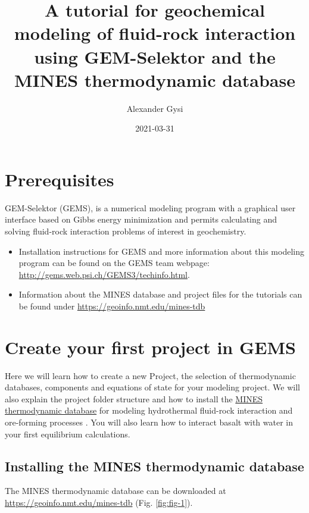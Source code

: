 \documentclass[
]{book}
\title{A tutorial for geochemical modeling of fluid-rock interaction using GEM-Selektor and the MINES thermodynamic database}
\author{Alexander Gysi}
\date{2021-03-31}
\begin{document}
\maketitle

{
\setcounter{tocdepth}{1}
\tableofcontents
}
\hypertarget{prerequisites}{%
\chapter*{Prerequisites}\label{prerequisites}}

GEM-Selektor (GEMS), is a numerical modeling program with a graphical user interface based on Gibbs energy minimization and permits calculating and solving fluid-rock interaction problems of interest in geochemistry.

\begin{itemize}
\item
  Installation instructions for GEMS and more information about this modeling program can be found on the GEMS team webpage: \url{http://gems.web.psi.ch/GEMS3/techinfo.html}.
\item
  Information about the MINES database and project files for the tutorials can be found under \url{https://geoinfo.nmt.edu/mines-tdb}
\end{itemize}

\hypertarget{intro}{%
\chapter{Create your first project in GEMS}\label{intro}}

Here we will learn how to create a new Project, the selection of thermodynamic databases, components and equations of state for your modeling project. We will also explain the project folder structure and how to install the \href{https://geoinfo.nmt.edu/mines-tdb}{MINES thermodynamic database} for modeling hydrothermal fluid-rock interaction and ore-forming processes . You will also learn how to interact basalt with water in your first equilibrium calculations.

\hypertarget{installing-the-mines-thermodynamic-database}{%
\section{Installing the MINES thermodynamic database}\label{installing-the-mines-thermodynamic-database}}

The MINES thermodynamic database can be downloaded at \url{https://geoinfo.nmt.edu/mines-tdb} (Fig. \ref{fig:fig-1}).
\end{document}
